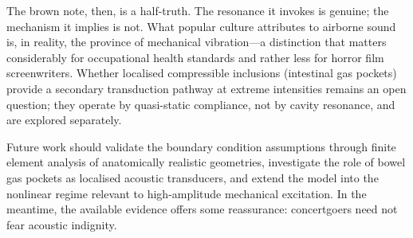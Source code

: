 The brown note, then, is a half-truth.  The resonance it invokes is genuine;
the mechanism it implies is not.  What popular culture attributes to airborne
sound is, in reality, the province of mechanical vibration---a distinction
that matters considerably for occupational health standards and rather less
for horror film screenwriters.  Whether localised compressible inclusions
(intestinal gas pockets) provide a secondary transduction pathway at extreme
intensities remains an open question; they operate by quasi-static compliance,
not by cavity resonance, and are explored separately.

Future work should validate the boundary condition assumptions through finite
element analysis of anatomically realistic geometries, investigate the role of
bowel gas pockets as localised acoustic transducers, and extend the model into
the nonlinear regime relevant to high-amplitude mechanical excitation.  In the
meantime, the available evidence offers some reassurance: concertgoers
need not fear acoustic indignity.
